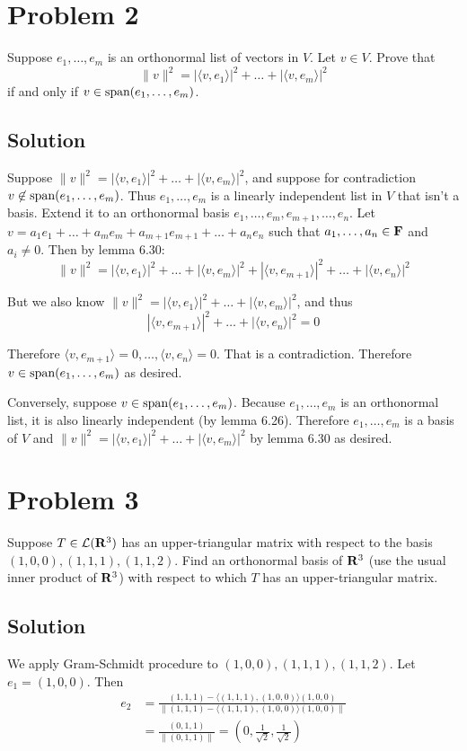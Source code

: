 \documentclass{article}
\begin{document}
\section*{Problem 2}
Suppose $e_1,\ldots,e_m$ is an orthonormal list of vectors in $V$. Let $v\in V$. Prove that
\[\|v\|^2=|\langle v,e_1\rangle|^2 + \ldots + |\langle v,e_m\rangle|^2\]
if and only if $v\in\text{span}(e_1,\ldots,e_m)$.

\subsection*{Solution}
Suppose $\|v\|^2=|\langle v,e_1\rangle|^2 + \ldots + |\langle v,e_m\rangle|^2$, and suppose for contradiction $v\not\in\text{span}(e_1,\ldots,e_m)$. Thus $e_1,\ldots,e_m$ is a linearly independent list in $V$ that isn't a basis. Extend it to an orthonormal basis $e_1,\ldots,e_m, e_{m+1}, \ldots, e_n$. Let $v=a_1e_1+\ldots+a_m e_m+a_{m+1}e_{m+1}+\ldots+a_n e_n$ such that $a_1,\ldots,a_n\in\mathbf{F}$ and $a_i\neq0$. Then by lemma 6.30:
\[\|v\|^2=|\langle v, e_1\rangle|^2+\ldots+|\langle v, e_m\rangle|^2+|\langle v, e_{m+1}\rangle|^2+\ldots+|\langle v, e_n\rangle|^2\]

But we also know $\|v\|^2=|\langle v,e_1\rangle|^2 + \ldots + |\langle v,e_m\rangle|^2$, and thus
\[|\langle v, e_{m+1}\rangle|^2+\ldots+|\langle v, e_n\rangle|^2=0\]

Therefore $\langle v, e_{m+1}\rangle=0,\ldots,\langle v, e_n\rangle=0$. That is a contradiction. Therefore $v\in\text{span}(e_1,\ldots,e_m)$ as desired.

\vs

Conversely, suppose $v\in\text{span}(e_1,\ldots,e_m)$. Because $e_1,\ldots,e_m$ is an orthonormal list, it is also linearly independent (by lemma 6.26). Therefore $e_1,\ldots,e_m$ is a basis of $V$ and $\|v\|^2=|\langle v,e_1\rangle|^2 + \ldots + |\langle v,e_m\rangle|^2$ by lemma 6.30 as desired.


\section*{Problem 3}
Suppose $T\in\mathcal{L}(\mathbf{R}^3)$ has an upper-triangular matrix with respect to the basis $(1,0,0), (1,1,1), (1,1,2)$. Find an orthonormal basis of $\mathbf{R}^3$ (use the usual inner product of $\mathbf{R}^3$) with respect to which $T$ has an upper-triangular matrix.

\subsection*{Solution}
We apply Gram-Schmidt procedure to $(1,0,0), (1,1,1), (1,1,2)$. Let $e_1=(1,0,0)$. Then
\begin{align*}
e_2&=\frac{(1,1,1)-\langle(1,1,1),(1,0,0)\rangle(1,0,0)}{\|(1,1,1)-\langle(1,1,1),(1,0,0)\rangle(1,0,0)\|}\\
&=\frac{(0,1,1)}{\|(0,1,1)\|}=(0,\frac{1}{\sqrt{2}}, \frac{1}{\sqrt{2}})
\end{align*}
\end{document}
